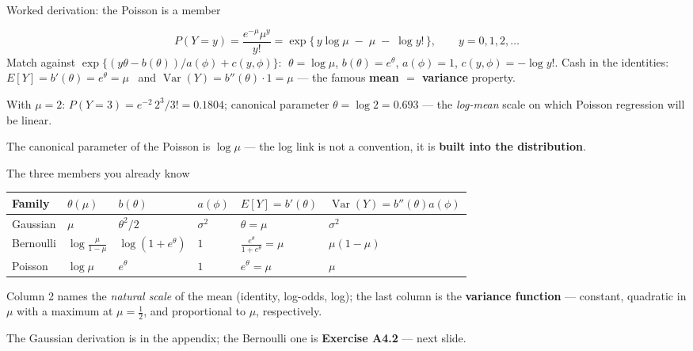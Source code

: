 \documentclass[aspectratio=169,11pt]{beamer}
\begin{document}
\begin{frame}{Worked derivation: the Poisson is a member}
  \footnotesize
  \begin{numexample}
    \[
      P(Y=y) = \frac{e^{-\mu}\mu^{y}}{y!}
      = \exp\{\, y\log\mu \;-\; \mu \;-\; \log y! \,\}, \qquad y = 0,1,2,\dots
    \]
    Match against $\exp\{(y\theta - b(\theta))/a(\phi) + c(y,\phi)\}$:
    $\;\theta = \log\mu$, \; $b(\theta) = e^{\theta}$, \; $a(\phi) = 1$, \;
    $c(y,\phi) = -\log y!$.
    Cash in the identities:
    $E[Y] = b'(\theta) = e^{\theta} = \mu$ \checkmark\ and
    $\operatorname{Var}(Y) = b''(\theta)\cdot 1 = \mu$ --- the famous
    \textbf{mean $=$ variance} property.
  \end{numexample}
  \begin{numexample}
    With $\mu = 2$: $P(Y=3) = e^{-2}\,2^3/3! = 0.1804$; canonical parameter
    $\theta = \log 2 = 0.693$ --- the \emph{log-mean} scale on which Poisson
    regression will be linear.
  \end{numexample}
  \begin{takeaway}
    The canonical parameter of the Poisson is $\log\mu$ --- the log link is not a
    convention, it is \textbf{built into the distribution}.
  \end{takeaway}
\end{frame}

\begin{frame}{The three members you already know}
  \footnotesize
  \begin{center}
  \begin{tabular}{@{}llllll@{}}
    \toprule
    \textbf{Family} & $\theta(\mu)$ & $b(\theta)$ & $a(\phi)$ & $E[Y]=b'(\theta)$ & $\operatorname{Var}(Y)=b''(\theta)a(\phi)$ \\
    \midrule
    Gaussian & $\mu$ & $\theta^2/2$ & $\sigma^2$ & $\theta=\mu$ & $\sigma^2$ \\
    Bernoulli & $\log\frac{\mu}{1-\mu}$ & $\log(1+e^{\theta})$ & $1$ & $\frac{e^{\theta}}{1+e^{\theta}}=\mu$ & $\mu(1-\mu)$ \\
    Poisson & $\log\mu$ & $e^{\theta}$ & $1$ & $e^{\theta}=\mu$ & $\mu$ \\
    \bottomrule
  \end{tabular}
  \end{center}
  \begin{readme}
    Column 2 names the \emph{natural scale} of the mean (identity, log-odds, log);
    the last column is the \textbf{variance function} --- constant, quadratic in $\mu$
    with a maximum at $\mu=\tfrac12$, and proportional to $\mu$, respectively.
  \end{readme}
  \begin{takeaway}
    The Gaussian derivation is in the appendix; the Bernoulli one is
    \textbf{Exercise A4.2} --- next slide.
  \end{takeaway}
\end{frame}
\end{document}
